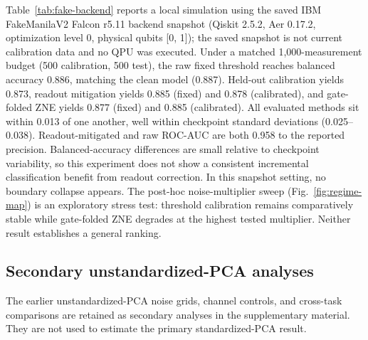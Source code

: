 \documentclass[conference]{IEEEtran}
\begin{document}
Table~\ref{tab:fake-backend} reports a local simulation using the saved IBM FakeManilaV2 Falcon r5.11 backend snapshot (Qiskit 2.5.2, Aer 0.17.2, optimization level 0, physical qubits [0, 1]); the saved snapshot is not current calibration data and no QPU was executed. Under a matched 1,000-measurement budget (500 calibration, 500 test), the raw fixed threshold reaches balanced accuracy 0.886, matching the clean model (0.887). Held-out calibration yields 0.873, readout mitigation yields 0.885 (fixed) and 0.878 (calibrated), and gate-folded ZNE yields 0.877 (fixed) and 0.885 (calibrated). All evaluated methods sit within 0.013 of one another, well within checkpoint standard deviations (0.025--0.038). Readout-mitigated and raw ROC-AUC are both 0.958 to the reported precision. Balanced-accuracy differences are small relative to checkpoint variability, so this experiment does not show a consistent incremental classification benefit from readout correction. In this snapshot setting, no boundary collapse appears. The post-hoc noise-multiplier sweep (Fig.~\ref{fig:regime-map}) is an exploratory stress test: threshold calibration remains comparatively stable while gate-folded ZNE degrades at the highest tested multiplier. Neither result establishes a general ranking.

\subsection{Secondary unstandardized-PCA analyses}
The earlier unstandardized-PCA noise grids, channel controls, and cross-task comparisons are retained as secondary analyses in the supplementary material. They are not used to estimate the primary standardized-PCA result.
\end{document}
